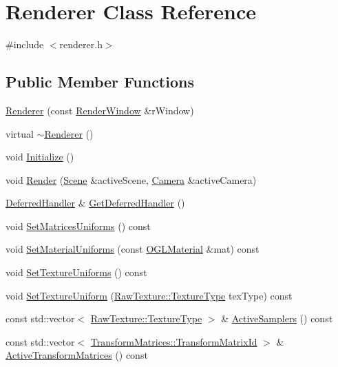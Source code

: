 \hypertarget{class_renderer}{}\section{Renderer Class Reference}
\label{class_renderer}


{\ttfamily \#include $<$renderer.\+h$>$}

\subsection*{Public Member Functions}
\begin{DoxyCompactItemize}
\item 
\hyperlink{class_renderer_abb257d89f41b81edc620c813b08738be}{Renderer} (const \hyperlink{class_render_window}{Render\+Window} \&r\+Window)
\item 
virtual \hyperlink{class_renderer_afeee408862d5bd6255a6882d47e6d5cd}{$\sim$\+Renderer} ()
\item 
void \hyperlink{class_renderer_a24e60dfccf32b9cfa5de30f977fb59d1}{Initialize} ()
\item 
void \hyperlink{class_renderer_abd933ca07472ed0e1c7f2395d75d2c33}{Render} (\hyperlink{class_scene}{Scene} \&active\+Scene, \hyperlink{class_camera}{Camera} \&active\+Camera)
\item 
\hyperlink{class_deferred_handler}{Deferred\+Handler} \& \hyperlink{class_renderer_aad4b44d34908982c66c19f0dd0afed6a}{Get\+Deferred\+Handler} ()
\item 
void \hyperlink{class_renderer_a5ff02ab1f661f3228c6189793fe748da}{Set\+Matrices\+Uniforms} () const 
\item 
void \hyperlink{class_renderer_a532ff8ca3b880e9bde117315486dd638}{Set\+Material\+Uniforms} (const \hyperlink{class_o_g_l_material}{O\+G\+L\+Material} \&mat) const 
\item 
void \hyperlink{class_renderer_af8290d1ac28f9dfd0246d1b63a56f34e}{Set\+Texture\+Uniforms} () const 
\item 
void \hyperlink{class_renderer_a213977213652a69a57982a8541be920b}{Set\+Texture\+Uniform} (\hyperlink{class_raw_texture_ac0eafe7206f7f38aeb4e8e5631480f6d}{Raw\+Texture\+::\+Texture\+Type} tex\+Type) const 
\item 
const std\+::vector$<$ \hyperlink{class_raw_texture_ac0eafe7206f7f38aeb4e8e5631480f6d}{Raw\+Texture\+::\+Texture\+Type} $>$ \& \hyperlink{class_renderer_a8510ecb3f806ee3ba69b5dec92f3d701}{Active\+Samplers} () const 
\item 
const std\+::vector$<$ \hyperlink{class_transform_matrices_ac0c0f9ab5279bfd44b4c1fd97f041521}{Transform\+Matrices\+::\+Transform\+Matrix\+Id} $>$ \& \hyperlink{class_renderer_ae6403cc8f28fcf5b6a69f58db6dd811d}{Active\+Transform\+Matrices} () const 

\end{DoxyCompactItemize}

